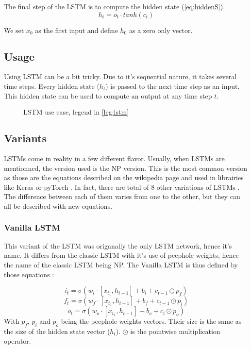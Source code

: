 The final step of the \ac{LSTM} is to compute the hidden state (\cref{eq:hiddenS}).
\begin{equation}\label{eq:hiddenS}
  h_t=o_t\cdot tanh(c_t)
\end{equation}

We set $x_0$ as the first input and define $h_0$ as a zero only vector.

\subsection{Usage}

Using \ac{LSTM} can be a bit tricky. Due to it's sequential nature, it takes several time steps. Every hidden state ($h_t$) is passed to the next time step as an input. This hidden state can be used to compute an output at any time step $t$.

\begin{figure}[H]
  \centering
  
  \caption{LSTM use case, legend in \cref{leg:lstm}}
  \label{fig:lstmUse}
\end{figure}

\subsection{Variants}

\acp{LSTM} come in reality in a few different flavor. Usually, when \acp{LSTM} are mentionned, the version used is the \ac{NP} version. This is the most common version as those are the equations described on the wikipedia page \cite{wikiLSTM} and used in librairies like Keras \cite{Keras} or pyTorch \cite{PyTorch}. In fact, there are total of 8 other variations of \acp{LSTM} \cite{nbLSTM}.
The difference between each of them varies from one to the other, but they can all be described with new equations.

\subsubsection{Vanilla \ac{LSTM}}
This variant of the \ac{LSTM} was origanally the only \ac{LSTM} network, hence it's name. It differs from the classic \ac{LSTM} with it's use of peephole weights, hence the name of the classic \ac{LSTM} being \acl{NP}. The Vanilla \ac{LSTM} is thus defined by those equations \cite{vanillaLSTM, nbLSTM} :

\begin{equation}\label{eq:inputGVanilla}
  i_t=\sigma (w_i\cdot[x_{t_1},h_{t-1}] + b_i+c_{t-1}\odot p_f)
\end{equation}
\begin{equation}\label{eq:forgetGVanilla}
  f_t=\sigma (w_f\cdot[x_{t_1},h_{t-1}] + b_f+c_{t-1}\odot p_i)
\end{equation}
\begin{equation}\label{eq:ouputGVanilla}
  o_t=\sigma (w_o\cdot[x_{t_1},h_{t-1}] + b_o+c_{t}\odot p_o)
\end{equation}
With $p_f$, $p_i$ and $p_o$ being the peephole weights vectors. Their size is the same as the size of the hidden state vector ($h_t$). $\odot$ is the pointwise multiplication operator.

